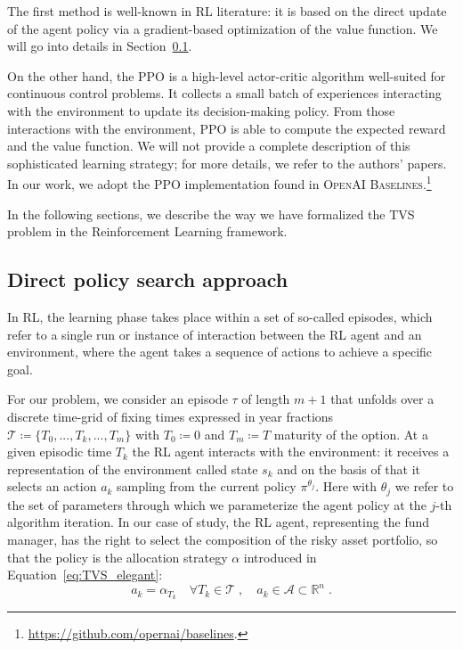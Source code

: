 \documentclass[runningheads]{m2ef}
\begin{document}
	The first method is well-known in RL literature: it is based on the direct update of the agent policy via a gradient-based optimization of the value function. We will go into details in Section~\ref{sec:direct_policy}.

	On the other hand, the PPO is a high-level actor-critic algorithm well-suited for continuous control problems. It collects a small batch of experiences interacting with the environment to update its decision-making policy. From those interactions with the environment, PPO is able to compute the expected reward and the value function. We will not provide a complete description of this sophisticated learning strategy; for more details, we refer to the authors' papers. In our work, we adopt the PPO implementation found in \textsc{OpenAI Baselines}.\footnote{\url{https://github.com/opernai/baselines}.} 

	In the following sections, we describe the way we have formalized the TVS problem in the Reinforcement Learning framework.


	\subsection{Direct policy search approach}\label{sec:direct_policy}
	In RL, the learning phase takes place within a set of so-called episodes, which refer to a single run or instance of interaction between the RL agent and an environment, where the agent takes a sequence of actions to achieve a specific goal.

	For our problem, we consider an episode $\tau$ of length $m+1$ that unfolds over a discrete time-grid of fixing times expressed in year fractions $\mathcal{T}\coloneqq \{T_0,...,T_k,...,T_m\}$ with $T_0\coloneqq 0$ and $T_m \coloneqq T$ maturity of the option. At a given episodic time $T_k$ the RL agent interacts with the environment: it receives a representation of the environment called state $s_k$ and on the basis of that it selects an action $a_k$ sampling from the current policy $\pi^{\theta_j}$. Here with $\theta_j$ we refer to the set of parameters through which we parameterize the agent policy at the $j$-th algorithm iteration. In our case of study, the RL agent, representing the fund manager, has the right to select the composition of the risky asset portfolio, so that the policy is the allocation strategy $\alpha$ introduced in Equation~\eqref{eq:TVS_elegant}:
	\begin{equation}
		a_k = \alpha_{T_k} \quad \forall T_k \in \mathcal{T} \; , \quad a_k \in \mathcal{A}\subset \mathbb{R}^n \; .
	\label{eq:action}\end{equation} 
\end{document}
